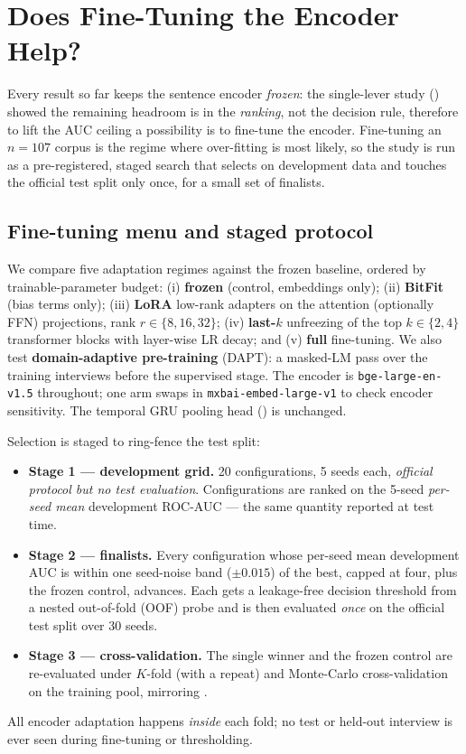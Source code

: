 \documentclass[conference]{IEEEtran}
\begin{document}
\iffalse
\section{Does Fine-Tuning the Encoder Help?}
\label{sec:finetune}

Every result so far keeps the sentence encoder \emph{frozen}: the
single-lever study () showed the remaining headroom is in the
\emph{ranking}, not the decision rule, therefore to lift the AUC ceiling a possibility is
to fine-tune the encoder.
Fine-tuning an $n\!=\!107$ corpus is the regime where over-fitting is most
likely, so the study is run as a pre-registered, staged search that selects on
development data and touches the official test split only once, for a small set
of finalists.

\subsection{Fine-tuning menu and staged protocol}
\label{sec:finetune-protocol}
We compare five adaptation regimes against the frozen baseline, ordered by
trainable-parameter budget: (i) \textbf{frozen} (control, embeddings only);
(ii) \textbf{BitFit} (bias terms only); (iii) \textbf{LoRA} low-rank adapters on
the attention (optionally FFN) projections, rank $r\!\in\!\{8,16,32\}$;
(iv) \textbf{last-$k$} unfreezing of the top $k\!\in\!\{2,4\}$ transformer
blocks with layer-wise LR decay; and (v) \textbf{full} fine-tuning. We also test
\textbf{domain-adaptive pre-training} (DAPT): a masked-LM pass over the training
interviews before the supervised stage. The encoder is \texttt{bge-large-en-v1.5}
throughout; one arm swaps in \texttt{mxbai-embed-large-v1} to check
encoder sensitivity. The temporal GRU pooling head
() is unchanged.

Selection is staged to ring-fence the test split:
\begin{itemize}
  \item \textbf{Stage 1 --- development grid.} 20 configurations, 5 seeds each,
        \emph{official protocol but no test evaluation}. Configurations are ranked on the 5-seed
        \emph{per-seed mean} development ROC-AUC --- the same quantity reported
        at test time.
  \item \textbf{Stage 2 --- finalists.} Every configuration whose per-seed mean
        development AUC is within one seed-noise band ($\pm0.015$) of the best,
        capped at four, plus the frozen control, advances. Each gets a
        leakage-free decision threshold from a nested out-of-fold (OOF) probe and
        is then evaluated \emph{once} on the official test split over 30 seeds.
  \item \textbf{Stage 3 --- cross-validation.} The single winner and the frozen
        control are re-evaluated under $K$-fold (with a repeat) and
        Monte-Carlo cross-validation on the training pool, mirroring
        .
\end{itemize}
All encoder adaptation happens \emph{inside} each fold; no test or
held-out interview is ever seen during fine-tuning or thresholding.
\end{document}
